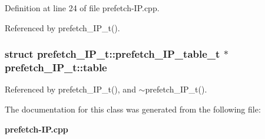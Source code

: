 Definition at line 24 of file prefetch-IP.cpp.

Referenced by prefetch\_\-IP\_\-t().
\subsubsection[{table}]{\setlength{\rightskip}{0pt plus 5cm}struct {\bf prefetch\_\-IP\_\-t::prefetch\_\-IP\_\-table\_\-t} $\ast$  {\bf prefetch\_\-IP\_\-t::table}\hspace{0.3cm}{\tt  [protected]}}\label{classprefetch__IP__t_58482b65be118a9dd26bc7366f347fa9}




Referenced by prefetch\_\-IP\_\-t(), and $\sim$prefetch\_\-IP\_\-t().

The documentation for this class was generated from the following file:\begin{CompactItemize}
\item 
{\bf prefetch-IP.cpp}\end{CompactItemize}
